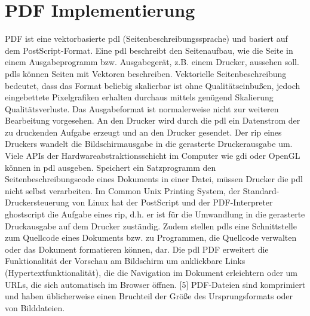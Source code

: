 \section{PDF Implementierung}
PDF ist eine vektorbasierte \gls{pdl} (Seitenbeschreibungssprache) und basiert auf dem PostScript-Format. Eine \gls{pdl} beschreibt den Seitenaufbau, wie die Seite in einem Ausgabeprogramm bzw. Ausgabegerät, z.B. einem Drucker, aussehen soll. \gls{pdl}s können Seiten mit Vektoren beschreiben. Vektorielle Seitenbeschreibung bedeutet, dass das Format beliebig skalierbar ist ohne Qualitätseinbußen, jedoch eingebettete Pixelgrafiken erhalten durchaus mittels genügend Skalierung Qualitätsverluste. Das Ausgabeformat ist normalerweise nicht zur weiteren Bearbeitung vorgesehen. An den Drucker wird durch die \gls{pdl} ein Datenstrom der zu druckenden Aufgabe erzeugt und an den Drucker gesendet. Der \gls{rip} eines Druckers wandelt die Bildschirmausgabe in die gerasterte Druckerausgabe um. Viele APIs der Hardwareabstraktionsschicht im Computer wie \gls{gdi} oder OpenGL können in \gls{pdl} ausgeben. Speichert ein Satzprogramm den Seitenbeschreibungscode eines Dokuments in einer Datei, müssen Drucker die \gls{pdl} nicht selbst verarbeiten. Im Common Unix Printing System, der Standard-Druckersteuerung von Linux hat der PostScript und der PDF-Interpreter ghostscript die Aufgabe eines \gls{rip}, d.h. er ist für die Umwandlung in die gerasterte Druckausgabe auf dem Drucker zuständig. Zudem stellen \gls{pdl}s eine Schnittstelle zum Quellcode eines Dokuments bzw. zu Programmen, die Quellcode verwalten oder das Dokument formatieren können, dar. Die \gls{pdl} PDF erweitert die Funktionalität der Vorschau am Bildschirm um anklickbare Links (Hypertextfunktionalität), die die Navigation im Dokument erleichtern oder um URLs, die sich automatisch im Browser öffnen. [5] PDF-Dateien sind komprimiert und haben üblicherweise einen Bruchteil der Größe des Ursprungsformats oder von Bilddateien. 


